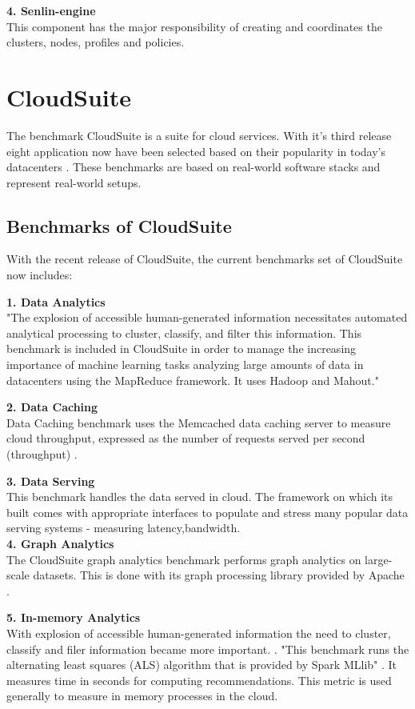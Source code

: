 \textbf{4. Senlin-engine} \\
This component has the major responsibility of creating and coordinates the clusters, nodes, profiles and policies.

\section{CloudSuite}
The benchmark CloudSuite is a suite for cloud services. With it's third release eight application now have been selected based on their popularity in today’s datacenters \cite{CloudSuiteBlog}. These benchmarks are based on real-world software stacks and represent real-world setups.
\subsection{Benchmarks of CloudSuite}
With the recent release of CloudSuite, the current benchmarks set of CloudSuite now includes: 

\textbf{1. Data Analytics} \\
"The explosion of accessible human-generated information necessitates automated analytical processing to cluster, classify, and filter this information. This benchmark is included in CloudSuite in order to manage the increasing importance of machine learning tasks analyzing large amounts of data in datacenters using the MapReduce framework. It uses Hadoop \cite{hadoop2018} and Mahout\cite{mahout2018}."\cite{CloudSuite_Data_Analytics}

\textbf{2. Data Caching} \\
Data Caching benchmark uses the Memcached \cite{memcached2018} data caching server to measure cloud throughput, expressed as the number of requests served per second (throughput) \cite{CloudSuite_Data_Caching}.

\textbf{3. Data Serving} \\
This benchmark handles the data served in cloud. The framework on which its built comes with appropriate interfaces to populate and stress many popular data serving systems - measuring latency,bandwidth.\\

\textbf{4. Graph Analytics} \\
The CloudSuite graph analytics benchmark performs graph analytics on large-scale datasets. This is done with its graph processing library provided by Apache \cite{apache2018}.

\textbf{5. In-memory Analytics} \\
With explosion of accessible human-generated information the need to cluster, classify and filer information became more important. \cite{klinger2012online}. "This benchmark runs the alternating least squares (ALS) algorithm that is provided by Spark MLlib" \cite{CloudSuite_In-Memory_Analytics}. It measures time in seconds for computing recommendations. This metric is used generally to measure in memory processes in the cloud.

